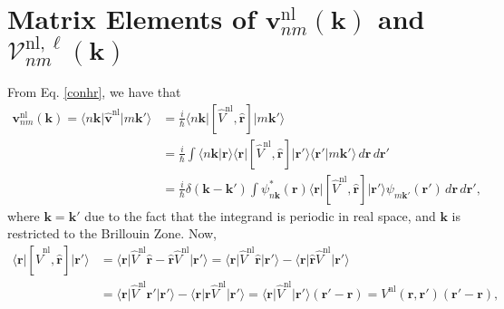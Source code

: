 
\section[Matrix Elements of the Nonlocal Potentials.]
{Matrix Elements of
\texorpdfstring{$\mathbf{v}^\mathrm{nl}_{nm}(\mathbf{k})$}{vnl} and 
\texorpdfstring{$\boldsymbol{\mathcal{V}}^{\mathrm{nl},\ell}_{nm}(\mathbf{k})$}
{calVnl}}
\label{app:vnlme}

From Eq. \eqref{conhr}, we have that
\begin{align}\label{vnln.0}
\mathbf{v}^\mathrm{nl}_{nm}(\mathbf{k})
 = \langle n\mathbf{k}\vert\hat{\mathbf{v}}^\mathrm{nl}\vert m\mathbf{k}'\rangle
&= \frac{i}{\hbar}\langle n\mathbf{k}\vert
   \left[\hat{V}^\mathrm{nl},\hat{\mathbf{r}}\right]
   \vert m\mathbf{k}'\rangle\nonumber\\
&= \frac{i}{\hbar}\int
   \langle n\mathbf{k}\vert\mathbf{r}\rangle
   \langle\mathbf{r}\vert
   \left[\hat{V}^\mathrm{nl},\hat{\mathbf{r}}\right]
   \vert\mathbf{r}'\rangle
   \langle\mathbf{r}'\vert m\mathbf{k}'\rangle
   \,d\mathbf{r}\,d\mathbf{r}'\nonumber\\
&= \frac{i}{\hbar}\delta(\mathbf{k}-\mathbf{k}')\int 
   \psi^{*}_{n\mathbf{k}}(\mathbf{r})
   \langle\mathbf{r}\vert
   \left[\hat{V}^\mathrm{nl},\hat{\mathbf{r}}\right]
   \vert\mathbf{r}'\rangle
   \psi_{m\mathbf{k}'}(\mathbf{r}')
   \,d\mathbf{r}\,d\mathbf{r}',
\end{align}   
where $\mathbf{k}=\mathbf{k}'$ due to the fact that the integrand is periodic in
real space, and $\mathbf{k}$ is restricted to the Brillouin Zone. Now,
\begin{align}\label{vnln.1}
\langle\mathbf{r}\vert
\left[\hat{V}^\mathrm{nl},\hat{\mathbf{r}}\right]
\vert\mathbf{r}'\rangle
&= \langle\mathbf{r}\vert\hat{V}^\mathrm{nl}\hat{\mathbf{r}}
   - \hat{\mathbf{r}}\hat{V}^\mathrm{nl}\vert\mathbf{r}'\rangle
 = \langle\mathbf{r}\vert
   \hat{V}^\mathrm{nl}\hat{\mathbf{r}}
   \vert\mathbf{r}'\rangle
   - \langle\mathbf{r}\vert
     \hat{\mathbf{r}}\hat{V}^\mathrm{nl}
     \vert\mathbf{r}'\rangle\nonumber\\
&= \langle\mathbf{r}\vert\hat{V}^\mathrm{nl} \mathbf{r}'\vert\mathbf{r}'\rangle
   - \langle\mathbf{r}\vert\mathbf{r}\hat{V}^\mathrm{nl}\vert\mathbf{r}'\rangle
 = \langle\mathbf{r}\vert\hat{V}^\mathrm{nl}\vert\mathbf{r}'\rangle
   (\mathbf{r}'-\mathbf{r})
 = V^\mathrm{nl}(\mathbf{r},\mathbf{r}')(\mathbf{r}'-\mathbf{r}),
\end{align}
